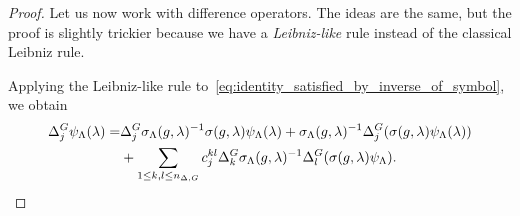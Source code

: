\begin{proof}
    Let us now work with difference operators.
    The ideas are the same,
    but the proof is slightly trickier
    because we have a \emph{Leibniz-like} rule instead of the classical Leibniz rule.

    Applying the Leibniz-like rule to~\eqref{eq:identity_satisfied_by_inverse_of_symbol},
    we obtain
    \begin{align*}
        {\Delta^{G}_{j}} \psi_\Lambda(\lambda)
        =
        &{\Delta^{G}_{j}} \sigma_\Lambda(g, \lambda)^{-1} \sigma(g, \lambda) \psi_\Lambda(\lambda)
        + \sigma_\Lambda(g, \lambda)^{-1} {\Delta^{G}_{j}} (\sigma(g, \lambda) \psi_\Lambda(\lambda))\\
        &+ \sum_{1 \leq k, l \leq n_{\Delta, G}} c_j^{k l} {\Delta^{G}_{k}} \sigma_\Lambda(g, \lambda)^{-1} {\Delta^{G}_{l}} (\sigma(g, \lambda) \psi_\Lambda).
    \end{align*}
\end{proof}

